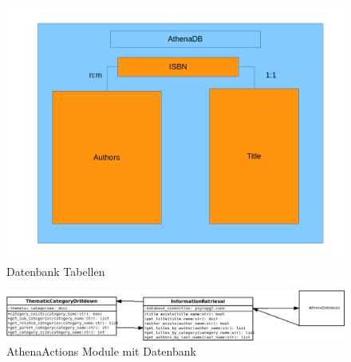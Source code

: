\documentclass[12pt,a4paper]{article}
\begin{document}
\begin{figure}[ht]
    \centering
    \includegraphics[width=\textwidth]{database_diag.png}
    \caption{Datenbank Tabellen}
    \label{fig:database_diagram}
\end{figure}

\begin{figure}[ht]
    \centering
    \includegraphics[width=\textwidth]{class_diag.png}
    \caption{AthenaActions Module mit Datenbank}
    \label{fig:class_diagram}
\end{figure}

{}

\end{document}
